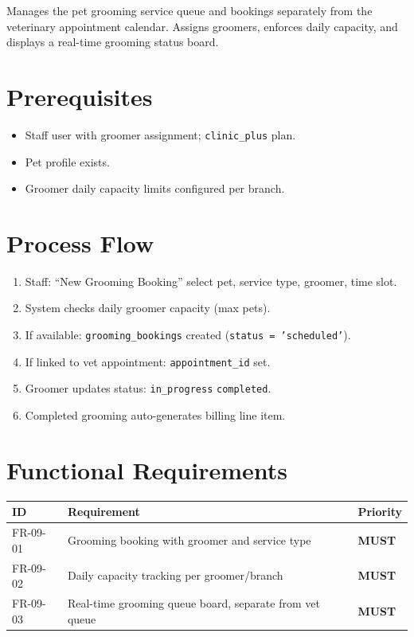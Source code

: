 \documentclass[12pt,a4paper]{report}
\newcommand{\must}{\colorbox{red!15}{\color{errorred}\textbf{\small MUST}}}
\begin{document}
Manages the pet grooming service queue and bookings separately from the veterinary appointment calendar. Assigns groomers, enforces daily capacity, and displays a real-time grooming status board.

\section{Prerequisites}

\begin{itemize}
  \item Staff user with groomer assignment; \texttt{clinic\_plus} plan.
  \item Pet profile exists.
  \item Groomer daily capacity limits configured per branch.
\end{itemize}

\section{Process Flow}

\begin{enumerate}
  \item Staff: ``New Grooming Booking'' \textrightarrow{} select pet, service type, groomer, time slot.
  \item System checks daily groomer capacity (max pets).
  \item If available: \texttt{grooming\_bookings} created (\texttt{status = 'scheduled'}).
  \item If linked to vet appointment: \texttt{appointment\_id} set.
  \item Groomer updates status: \texttt{in\_progress} \textrightarrow{} \texttt{completed}.
  \item Completed grooming auto-generates billing line item.
\end{enumerate}

\section{Functional Requirements}

\begin{longtable}{L{2.5cm} L{9cm} C{2cm}}
\toprule
\textbf{ID} & \textbf{Requirement} & \textbf{Priority} \\\midrule\endhead\bottomrule\endfoot
FR-09-01 & Grooming booking with groomer and service type & \must \\
FR-09-02 & Daily capacity tracking per groomer/branch & \must \\
FR-09-03 & Real-time grooming queue board, separate from vet queue & \must \\
\end{longtable}
\end{document}
